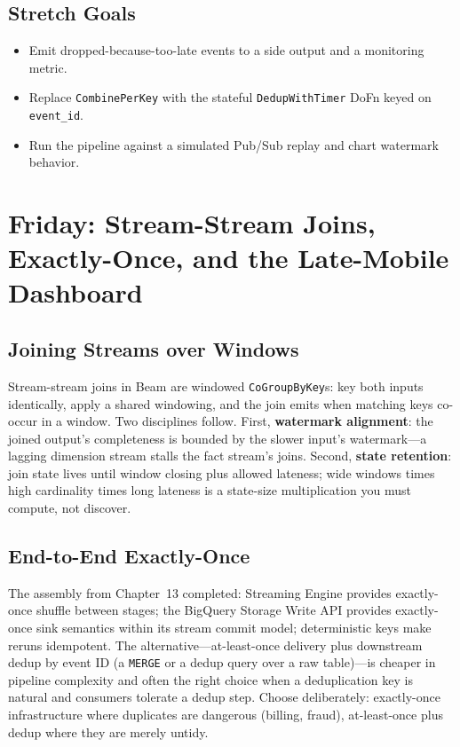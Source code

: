 \subsection*{Stretch Goals}
\begin{itemize}
    \item Emit dropped-because-too-late events to a side output and a monitoring metric.
    \item Replace \texttt{CombinePerKey} with the stateful \texttt{DedupWithTimer} DoFn keyed on \texttt{event\_id}.
    \item Run the pipeline against a simulated Pub/Sub replay and chart watermark behavior.
\end{itemize}

\section{Friday: Stream-Stream Joins, Exactly-Once, and the Late-Mobile Dashboard}

\subsection{Joining Streams over Windows}
Stream-stream joins in Beam are windowed \texttt{CoGroupByKey}s: key both inputs identically, apply a shared windowing, and the join emits when matching keys co-occur in a window. Two disciplines follow. First, \textbf{watermark alignment}: the joined output's completeness is bounded by the slower input's watermark---a lagging dimension stream stalls the fact stream's joins. Second, \textbf{state retention}: join state lives until window closing plus allowed lateness; wide windows times high cardinality times long lateness is a state-size multiplication you must compute, not discover.

\subsection{End-to-End Exactly-Once}
The assembly from Chapter~13 completed: Streaming Engine provides exactly-once shuffle between stages; the BigQuery Storage Write API provides exactly-once sink semantics within its stream commit model; deterministic keys make reruns idempotent. The alternative---at-least-once delivery plus downstream dedup by event ID (a \texttt{MERGE} or a dedup query over a raw table)---is cheaper in pipeline complexity and often the right choice when a deduplication key is natural and consumers tolerate a dedup step. Choose deliberately: exactly-once infrastructure where duplicates are dangerous (billing, fraud), at-least-once plus dedup where they are merely untidy.

